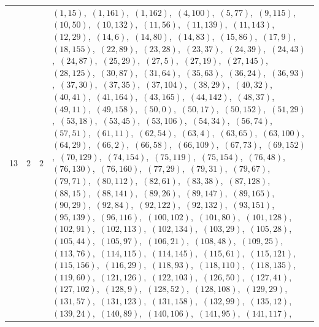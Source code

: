\documentclass[11pt]{article}
\begin{document}
\begin{longtable}{@{}rrl>{\raggedright\arraybackslash}p{}@{}}
13 & 2 & $2$ & $(1,15)$,\allowbreak\ $(1,161)$,\allowbreak\ $(1,162)$,\allowbreak\ $(4,100)$,\allowbreak\ $(5,77)$,\allowbreak\ $(9,115)$,\allowbreak\ $(10,50)$,\allowbreak\ $(10,132)$,\allowbreak\ $(11,56)$,\allowbreak\ $(11,139)$,\allowbreak\ $(11,143)$,\allowbreak\ $(12,29)$,\allowbreak\ $(14,6)$,\allowbreak\ $(14,80)$,\allowbreak\ $(14,83)$,\allowbreak\ $(15,86)$,\allowbreak\ $(17,9)$,\allowbreak\ $(18,155)$,\allowbreak\ $(22,89)$,\allowbreak\ $(23,28)$,\allowbreak\ $(23,37)$,\allowbreak\ $(24,39)$,\allowbreak\ $(24,43)$,\allowbreak\ $(24,87)$,\allowbreak\ $(25,29)$,\allowbreak\ $(27,5)$,\allowbreak\ $(27,19)$,\allowbreak\ $(27,145)$,\allowbreak\ $(28,125)$,\allowbreak\ $(30,87)$,\allowbreak\ $(31,64)$,\allowbreak\ $(35,63)$,\allowbreak\ $(36,24)$,\allowbreak\ $(36,93)$,\allowbreak\ $(37,30)$,\allowbreak\ $(37,35)$,\allowbreak\ $(37,104)$,\allowbreak\ $(38,29)$,\allowbreak\ $(40,32)$,\allowbreak\ $(40,41)$,\allowbreak\ $(41,164)$,\allowbreak\ $(43,165)$,\allowbreak\ $(44,142)$,\allowbreak\ $(48,37)$,\allowbreak\ $(49,11)$,\allowbreak\ $(49,158)$,\allowbreak\ $(50,0)$,\allowbreak\ $(50,17)$,\allowbreak\ $(50,152)$,\allowbreak\ $(51,29)$,\allowbreak\ $(53,18)$,\allowbreak\ $(53,45)$,\allowbreak\ $(53,106)$,\allowbreak\ $(54,34)$,\allowbreak\ $(56,74)$,\allowbreak\ $(57,51)$,\allowbreak\ $(61,11)$,\allowbreak\ $(62,54)$,\allowbreak\ $(63,4)$,\allowbreak\ $(63,65)$,\allowbreak\ $(63,100)$,\allowbreak\ $(64,29)$,\allowbreak\ $(66,2)$,\allowbreak\ $(66,58)$,\allowbreak\ $(66,109)$,\allowbreak\ $(67,73)$,\allowbreak\ $(69,152)$,\allowbreak\ $(70,129)$,\allowbreak\ $(74,154)$,\allowbreak\ $(75,119)$,\allowbreak\ $(75,154)$,\allowbreak\ $(76,48)$,\allowbreak\ $(76,130)$,\allowbreak\ $(76,160)$,\allowbreak\ $(77,29)$,\allowbreak\ $(79,31)$,\allowbreak\ $(79,67)$,\allowbreak\ $(79,71)$,\allowbreak\ $(80,112)$,\allowbreak\ $(82,61)$,\allowbreak\ $(83,38)$,\allowbreak\ $(87,128)$,\allowbreak\ $(88,15)$,\allowbreak\ $(88,141)$,\allowbreak\ $(89,26)$,\allowbreak\ $(89,147)$,\allowbreak\ $(89,165)$,\allowbreak\ $(90,29)$,\allowbreak\ $(92,84)$,\allowbreak\ $(92,122)$,\allowbreak\ $(92,132)$,\allowbreak\ $(93,151)$,\allowbreak\ $(95,139)$,\allowbreak\ $(96,116)$,\allowbreak\ $(100,102)$,\allowbreak\ $(101,80)$,\allowbreak\ $(101,128)$,\allowbreak\ $(102,91)$,\allowbreak\ $(102,113)$,\allowbreak\ $(102,134)$,\allowbreak\ $(103,29)$,\allowbreak\ $(105,28)$,\allowbreak\ $(105,44)$,\allowbreak\ $(105,97)$,\allowbreak\ $(106,21)$,\allowbreak\ $(108,48)$,\allowbreak\ $(109,25)$,\allowbreak\ $(113,76)$,\allowbreak\ $(114,115)$,\allowbreak\ $(114,145)$,\allowbreak\ $(115,61)$,\allowbreak\ $(115,121)$,\allowbreak\ $(115,156)$,\allowbreak\ $(116,29)$,\allowbreak\ $(118,93)$,\allowbreak\ $(118,110)$,\allowbreak\ $(118,135)$,\allowbreak\ $(119,60)$,\allowbreak\ $(121,126)$,\allowbreak\ $(122,103)$,\allowbreak\ $(126,50)$,\allowbreak\ $(127,41)$,\allowbreak\ $(127,102)$,\allowbreak\ $(128,9)$,\allowbreak\ $(128,52)$,\allowbreak\ $(128,108)$,\allowbreak\ $(129,29)$,\allowbreak\ $(131,57)$,\allowbreak\ $(131,123)$,\allowbreak\ $(131,158)$,\allowbreak\ $(132,99)$,\allowbreak\ $(135,12)$,\allowbreak\ $(139,24)$,\allowbreak\ $(140,89)$,\allowbreak\ $(140,106)$,\allowbreak\ $(141,95)$,\allowbreak\ $(141,117)$,\allowbreak\ 
\end{longtable}
\end{document}
